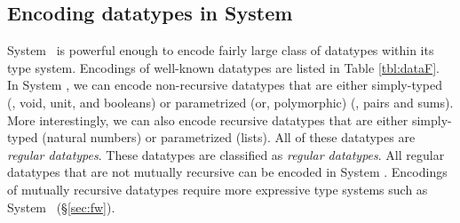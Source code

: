 \subsection{Encoding datatypes in System \F}
\label{sec:f:data}
System \F\ is  powerful enough to encode fairly large class of datatypes
within its type system. Encodings of well-known datatypes are listed in
Table \ref{tbl:dataF}. In System \F, we can encode non-recursive datatypes
that are either simply-typed (\eg, void, unit, and booleans)
or parametrized (or, polymorphic) (\eg, pairs and sums).
More interestingly, we can also encode recursive datatypes
that are either simply-typed (natural numbers) or parametrized (lists).
All of these datatypes are \emph{regular datatypes}.
These datatypes are classified as \emph{regular datatypes}.
All regular datatypes that are not mutually recursive can be
encoded in System \F. Encodings of mutually recursive datatypes require
more expressive type systems such as System \Fw\ (\S\ref{sec:fw}).

